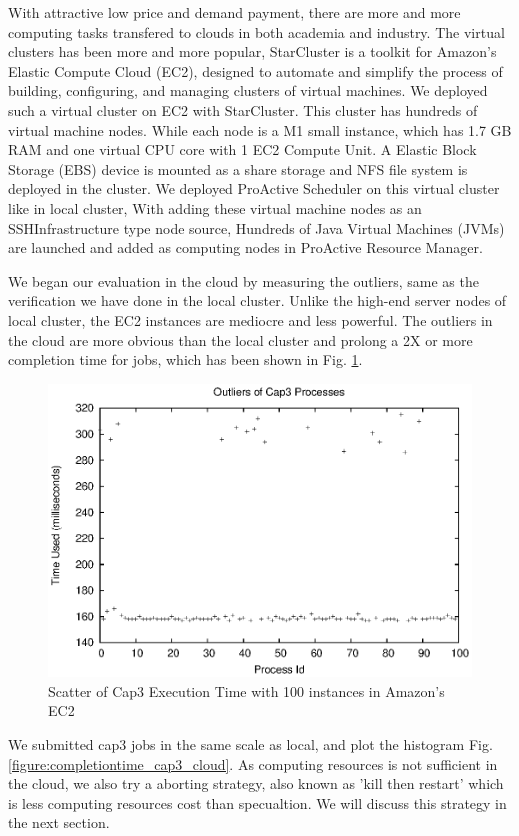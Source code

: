 With attractive low price and demand payment, there are more and more computing tasks transfered to clouds in both academia and industry. The virtual clusters has been more and more popular, StarCluster is a toolkit for Amazon’s Elastic Compute Cloud (EC2), designed to automate and simplify the process of building, configuring, and managing clusters of virtual machines. We deployed such a virtual cluster on EC2 with StarCluster. This cluster has hundreds of virtual machine nodes. While each node is a M1 small instance, which has 1.7 GB RAM and one virtual CPU core with 1 EC2 Compute Unit. A Elastic Block Storage (EBS) device is mounted as a share storage and  NFS file system is deployed in the cluster. We deployed ProActive Scheduler on this virtual cluster like in local cluster, With adding these virtual machine nodes as an SSHInfrastructure type node source, Hundreds of Java Virtual Machines (JVMs) are launched and added as computing nodes in ProActive Resource Manager.

We began our evaluation in the cloud by measuring the outliers, same as the verification we have done in the local cluster. Unlike the high-end server nodes of local cluster, the EC2 instances are mediocre and less powerful. The outliers in the cloud are more obvious than the local cluster and prolong a 2X or more completion time for jobs, which has been shown in Fig. \ref{figure:outlier_cloud}.

\begin{figure}
\centering
\includegraphics[width=0.9\columnwidth]{figures/cloud_outliers.eps}
\caption{Scatter of Cap3 Execution Time with 100 instances in Amazon's EC2}
\label{figure:outlier_cloud}
\end{figure}

We submitted cap3 jobs in the same scale as local, and plot the histogram Fig. \ref{figure:completiontime_cap3_cloud}. As computing resources is not sufficient in the cloud, we also try a aborting strategy, also known as 'kill then restart' which is less computing resources cost than specualtion. We will discuss this strategy in the next section.

